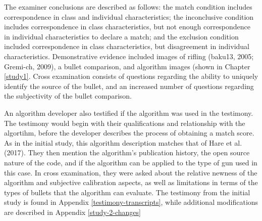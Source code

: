\documentclass[print]{nuthesis}
\begin{document}
The examiner conclusions are described as follows: the match condition includes correspondence in class and individual characteristics; the inconclusive condition includes correspondence in class characteristics, but not enough correspondence in individual characteristics to declare a match; and the exclusion condition included correspondence in class characteristics, but disagreement in individual characteristics.
Demonstrative evidence included images of rifling (baku13, 2005; Gremi-ch, 2009), a bullet comparison, and algorithm images (shown in Chapter \ref{study1}.
Cross examination consists of questions regarding the ability to uniquely identify the source of the bullet, and an increased number of questions regarding the subjectivity of the bullet comparison.

An algorithm developer also testified if the algorithm was used in the testimony.
The testimony would begin with their qualifications and relationship with the algortihm, before the developer describes the process of obtaining a match score.
As in the initial study, this algorithm description matches that of Hare et al. (2017).
They then mention the algorithm's publication history, the open source nature of the code, and if the algorithm can be applied to the type of gun used in this case.
In cross examination, they were asked about the relative newness of the algorithm and subjective calibration aspects, as well as limitations in terms of the types of bullets that the algorithm can evaluate.
The testimony from the initial study is found in Appendix \ref{testimony-transcripts}, while additional modifications are described in Appendix \ref{study-2-changes}
\end{document}
